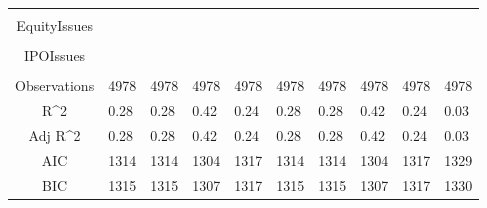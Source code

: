 \documentclass{article}
\begin{document}
\begin{table}[H]
\begin{tabular}{|clllllllll|}
   &  &  &  &  &  &  &  &  &  \\ 
  EquityIssues &  &  &  &  &  &  &  &  &  \\ 
   &  &  &  &  &  &  &  &  &  \\ 
  IPOIssues &  &  &  &  &  &  &  &  &  \\ 
   &  &  &  &  &  &  &  &  &  \\ 
  \hline 
 Observations & 4978 & 4978 & 4978 & 4978 & 4978 & 4978 & 4978 & 4978 & 4978 \\ 
  R^2 & 0.28 & 0.28 & 0.42 & 0.24 & 0.28 & 0.28 & 0.42 & 0.24 & 0.03 \\ 
  Adj R^2 & 0.28 & 0.28 & 0.42 & 0.24 & 0.28 & 0.28 & 0.42 & 0.24 & 0.03 \\ 
  AIC & 1314 & 1314 & 1304 & 1317 & 1314 & 1314 & 1304 & 1317 & 1329 \\ 
  BIC & 1315 & 1315 & 1307 & 1317 & 1315 & 1315 & 1307 & 1317 & 1330 \\ 
   \hline
\end{tabular}
 
\end{table}
\end{document}
